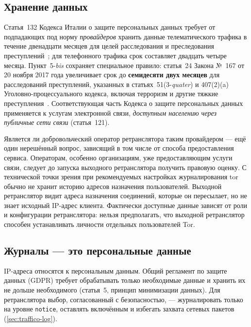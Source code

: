 \subsection{Хранение данных}

Статья~132 Кодекса Италии о защите персональных данных требует от подпадающих под норму \emph{провайдеров} хранить данные телематического трафика в течение двенадцати месяцев для целей расследования и преследования преступлений~\cite{codiceprivacy}; для телефонного трафика срок составляет двадцать четыре месяца. Пункт~5-\emph{bis} сохраняет специальное правило: статья~24 Закона №~167 от 20 ноября 2017 года увеличивает срок до \textbf{семидесяти двух месяцев} для расследований преступлений, указанных в статьях~51(3-\emph{quater}) и 407(2)(a) Уголовно-процессуального кодекса, включая терроризм и другие тяжкие преступления~\cite{legge167}. Соответствующая часть Кодекса о защите персональных данных применяется к услугам электронной связи, \emph{доступным населению через публичные сети связи} (статья~121).

Является ли добровольческий оператор ретранслятора таким провайдером — ещё один нерешённый вопрос, зависящий в том числе от способа предоставления сервиса. Операторам, особенно организациям, уже предоставляющим услуги связи, следует до запуска выходного ретранслятора получить правовую оценку. С технической точки зрения при рекомендуемых настройках журналирования tor обычно не хранит историю адресов назначения пользователей. Выходной ретранслятор видит адреса назначения соединений, которые он пересылает, но не знает исходный IP-адрес клиента. Фактически доступные данные зависят от роли и конфигурации ретранслятора: нельзя предполагать, что выходной ретранслятор способен устанавливать личности отдельных пользователей Tor.

\subsection{Журналы — это персональные данные}

IP-адреса относятся к персональным данным. Общий регламент по защите данных (GDPR) требует обрабатывать только необходимые данные и хранить их не дольше необходимого (статья~5, принцип минимизации данных). Для ретранслятора выбор, согласованный с безопасностью, — журналировать только на уровне \texttt{notice}, оставлять  включённым и избегать захвата сетевых пакетов (\cref{sec:traffico-log}).

